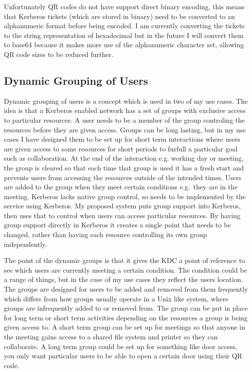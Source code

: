\documentclass[]{report}   %
\begin{document}
Unfortunately QR codes do not have support direct binary encoding, this means that Kerberos tickets (which are stored in binary) need to be converted to an alphanumeric format before being encoded. I am currently converting the tickets to the string representation of hexadecimal but in the future I will convert them to base64 because it makes more use of the alphanumeric character set, allowing QR code sizes to be reduced further.

\subsection{Dynamic Grouping of Users}
Dynamic grouping of users is a concept which is used in two of my use cases. The idea is that a Kerberos enabled network has a set of groups with exclusive access to particular resources. A user needs to be a member of the group controling the resources before they are given access. Groups can be long lasting, but in my use cases I have designed them to be set up for short term interactions where users are given access to some resources for short periods to furfull a particular goal such as collaboration. At the end of the interaction e.g. working day or meeting, the group is cleared so that each time that group is used it has a fresh start and prevents users from accessing the resources outside of the intended times. Users are added to the group when they meet certain conditions e.g.\ they are in the meeting. Kerberos lacks native group control, so needs to be implemented by the service using Kerberos. My proposed system puts group support into Kerberos, then uses that to control when users can access particular resources. By having group support directly in Kerberos it creates a single point that needs to be changed, rather than having each resource controlling its own group independently.

The point of the dynamic groups is that it gives the KDC a point of reference to see which users are currently meeting a certain condition. The condition could be a range of things, but in the case of my use cases they reflect the users location. The groups are designed for users to be added and removed from them frequently which differs from how groups usually operate in a Unix like system, where groups are infrequently added to or removed from. The group can be put in place for long term or short term activities depending on the resources a group is being given access to. A short term group can be set up for meetings so that anyone in the meeting gains access to a shared file system and printer so they can collaborate. A long term group could be set up for something like door access, you only want particular users to be able to open a certain door using their QR code.
\end{document}
